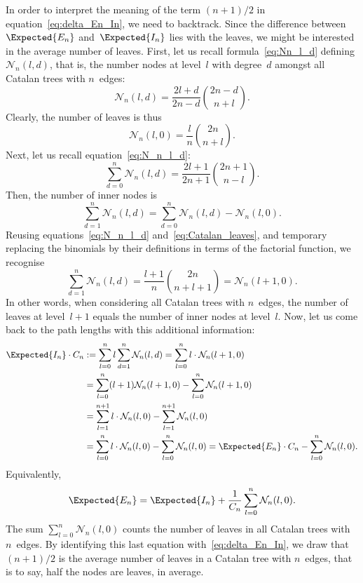 In order to interpret the meaning of the term \((n+1)/2\) in
equation~\eqref{eq:delta_En_In}, we need to backtrack. Since the
difference between \(\Expected{E_n}\) and~\(\Expected{I_n}\) lies with
the leaves, we might be interested in the average number of
leaves. First, let us recall formula~\eqref{eq:Nn_l_d} defining
\(\mathcal{N}_n(l,d)\), that is, the number nodes at level~\(l\) with
degree~\(d\) amongst all Catalan trees with \(n\)~edges:
\begin{equation*}
\mathcal{N}_n(l,d) = \frac{2l+d}{2n-d}\binom{2n-d}{n+l}.
\end{equation*}
Clearly, the number of leaves is thus
\begin{equation}
\mathcal{N}_n(l,0) = \frac{l}{n} \binom{2n}{n+l}.
\label{eq:Catalan_leaves}
\end{equation}
Next, let us recall equation~\eqref{eq:N_n_l_d}:
\begin{equation*}
\sum_{d=0}^{n}\mathcal{N}_n(l,d) = \frac{2l+1}{2n+1}\binom{2n+1}{n-l}.
\end{equation*}
Then, the number of inner nodes is
\begin{equation*}
  \sum_{d=1}^{n}\mathcal{N}_n(l,d) =
    \sum_{d=0}^{n}\mathcal{N}_n(l,d) - \mathcal{N}_n(l,0).
\end{equation*}
Reusing equations~\eqref{eq:N_n_l_d} and~\eqref{eq:Catalan_leaves},
and temporary replacing the binomials by their definitions in terms of
the factorial function, we recognise
\begin{equation*}
\sum_{d=1}^{n}\mathcal{N}_n(l,d) = \frac{l+1}{n} \binom{2n}{n+l+1} 
                               = \mathcal{N}_n(l+1,0).
\end{equation*}
In other words, when considering all Catalan trees with \(n\)~edges,
the number of leaves at level~\(l+1\) equals the number of inner nodes
at level~\(l\). Now, let us come back to the path lengths with this
additional information:
\begin{align*}
\Expected{I_n} \cdot C_n
  &:= \sum_{l=0}^{n} l \sum_{d=1}^{n}\mathcal{N}_n(l,d)
    = \sum_{l=0}^{n} l \cdot \mathcal{N}_n(l+1,0)\\
   &=   \sum_{l=0}^{n} (l+1) \mathcal{N}_n(l+1,0)
      - \sum_{l=0}^{n} \mathcal{N}_n(l+1,0)\\
   &=   \sum_{l=1}^{n+1} l \cdot \mathcal{N}_n(l,0)
      - \sum_{l=1}^{n+1} \mathcal{N}_n(l,0)\\
   &=   \sum_{l=0}^{n} l \cdot \mathcal{N}_n(l,0)
      - \sum_{l=0}^{n} \mathcal{N}_n(l,0)
    = \Expected{E_n} \cdot C_n - \sum_{l=0}^{n} \mathcal{N}_n(l,0).
\end{align*}
Equivalently,
\begin{equation*}
\Expected{E_n} 
  = \Expected{I_n} + \frac{1}{C_n} \sum_{l=0}^{n} \mathcal{N}_n(l,0).
\end{equation*}
The sum \(\sum_{l=0}^{n} \mathcal{N}_n(l,0)\) counts the number of
leaves in all Catalan trees with \(n\)~edges. By identifying this last
equation with~\eqref{eq:delta_En_In}, we draw that \((n+1)/2\) is the
average number of leaves in a Catalan tree with \(n\)~edges, that is
to say, half the nodes are leaves, in average. 
